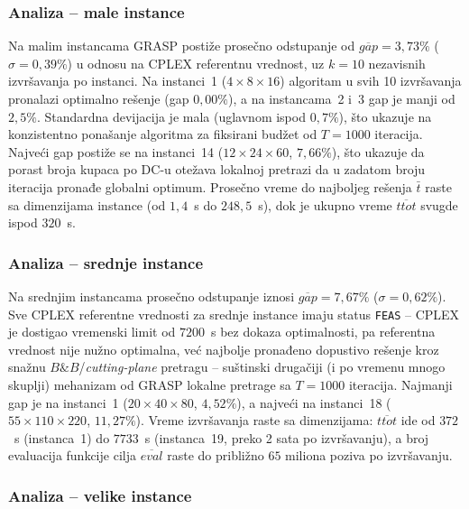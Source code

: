 \documentclass[12pt,a4paper]{article}
\begin{document}
\subsubsection{Analiza -- male instance}

Na malim instancama GRASP postiže prosečno odstupanje od $\overline{gap} =
3{,}73\%$ ($\sigma = 0{,}39\%$) u odnosu na CPLEX referentnu vrednost, uz
$k=10$ nezavisnih izvršavanja po instanci. Na instanci~1 ($4 \times 8 \times
16$) algoritam u svih 10 izvršavanja pronalazi optimalno rešenje (gap
$0{,}00\%$), a na instancama~2 i~3 gap je manji od $2{,}5\%$. Standardna
devijacija je mala (uglavnom ispod $0{,}7\%$), što ukazuje na konzistentno
ponašanje algoritma za fiksirani budžet od $T=1000$ iteracija. Najveći gap
postiže se na instanci~14 ($12 \times 24 \times 60$, $7{,}66\%$), što ukazuje
da porast broja kupaca po DC-u otežava lokalnoj pretrazi da u zadatom broju
iteracija pronađe globalni optimum. Prosečno vreme do najboljeg rešenja
$\bar t$ raste sa dimenzijama instance (od $1{,}4$~s do $248{,}5$~s), dok je
ukupno vreme $\overline{ttot}$ svugde ispod $320$~s.

\subsubsection{Analiza -- srednje instance}

Na srednjim instancama prosečno odstupanje iznosi $\overline{gap} = 7{,}67\%$
($\sigma = 0{,}62\%$). Sve CPLEX referentne vrednosti za srednje instance
imaju status \texttt{FEAS} -- CPLEX je dostigao vremenski limit od $7200$~s bez
dokaza optimalnosti, pa referentna vrednost nije nužno optimalna, već najbolje
pronađeno dopustivo rešenje kroz snažnu $B\&B$/\textit{cutting-plane} pretragu
-- suštinski drugačiji (i po vremenu mnogo skuplji) mehanizam od GRASP lokalne
pretrage sa $T=1000$ iteracija. Najmanji gap je na instanci~1
($20\times40\times80$, $4{,}52\%$), a najveći na instanci~18
($55\times110\times220$, $11{,}27\%$). Vreme izvršavanja raste sa dimenzijama:
$\overline{ttot}$ ide od $372$~s (instanca~1) do $7733$~s (instanca~19, preko
2 sata po izvršavanju), a broj evaluacija funkcije cilja $\overline{eval}$
raste do približno $65$ miliona poziva po izvršavanju.

\subsubsection{Analiza -- velike instance}
\end{document}
